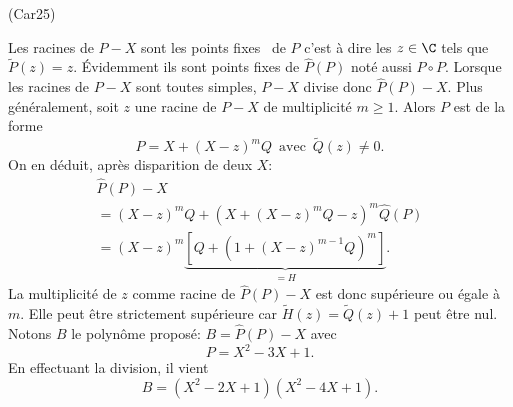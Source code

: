 \begin{tiny}(Car25)\end{tiny} Les racines de $P - X$ sont les \og points fixes\fg~ de $P$ c'est à dire les $z \in \C$ tels que $\widetilde{P}(z) = z$. \'Evidemment ils sont points fixes de $\widehat{P}(P)$ noté aussi $P\circ P$.\newline
Lorsque les racines de $P - X$ sont toutes simples, $P-X$ divise donc $\widehat{P}(P) -X$.\newline
Plus généralement, soit $z$ une racine de $P-X$ de multiplicité $m\geq1$. Alors $P$ est de la forme
\[
  P = X + (X-z)^m Q \,\text{ avec }\, \widetilde{Q}(z) \neq 0.
\]
On en déduit, après disparition de deux $X$:
\begin{multline*}
  \widehat{P}(P) - X\\
  = (X-z)^m Q + \left( X + (X-z)^m Q - z\right)^m \widehat{Q}(P)\\
  = (X-z)^m \underset{ = H}{\underbrace{\left[ Q + \left(1 + (X-z)^{m-1}Q\right)^m\right]}}.
\end{multline*}
La multiplicité de $z$ comme racine de $\widehat{P}(P) - X$ est donc supérieure ou égale à $m$. Elle peut être strictement supérieure car 
$\widetilde{H}(z)= \widetilde{Q}(z) + 1$ peut être nul.\newline
Notons $B$ le polynôme proposé:  $B = \widehat{P}(P) - X$ avec 
\[
  P = X^2 - 3X +1.
\]
En effectuant la division, il vient
\[
  B = (X^2 - 2X + 1)(X^2 - 4X +1).
\]

